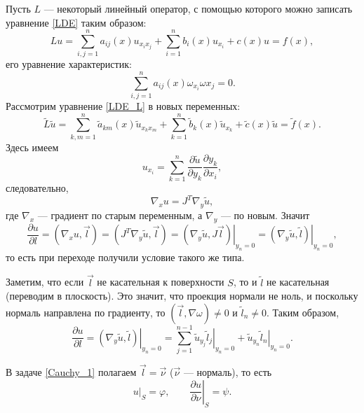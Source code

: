 \documentclass[12pt,a5paper]{book}
\begin{document}
	Пусть $L$ --- некоторый линейный оператор, с помощью которого можно записать уравнение \eqref{LDE} таким образом:
	\begin{equation}\label{LDE_L}
		Lu = \sum_{i,j=1}^{n}a_{ij}(x)u_{x_ix_j} + \sum_{i=1}^{n}b_i(x)u_{x_i} + c(x)u = f(x),
	\end{equation}
	его уравнение характеристик:
	\begin{equation}\label{eq_char_L}
		\sum_{i,j=1}^{n}a_{ij}(x)\omega_{x_i}\omega{x_j} = 0.
	\end{equation}
	Рассмотрим уравнение \eqref{LDE_L} в новых переменных:
	\begin{equation}\label{LDE_L_new}
		\tilde{L}\tilde{u} = \sum_{k,m=1}^{n}\tilde{a}_{km}(x)\tilde{u}_{x_kx_m} + \sum_{k=1}^{n}\tilde{b}_k(x)\tilde{u}_{x_k} + \tilde{c}(x)\tilde{u} = \tilde{f}(x).
	\end{equation}
	Здесь имеем
	\begin{equation*}
		u_{x_i} = \sum_{k=1}^{n}\frac{\partial\tilde{u}}{\partial y_k}\frac{\partial y_k}{\partial x_i},
	\end{equation*}
	следовательно,
	\begin{equation*}
		\nabla_x u = J^T\nabla_y \tilde{u},
	\end{equation*}
	где $\nabla_x$ --- градиент по старым переменным, а $\nabla_y$ --- по новым. Значит
	\begin{equation*}
		\frac{\partial u}{\partial l} = \left(\nabla_x u, \vec{l}\right) = \left(J^T\nabla_y \tilde{u}, \vec{l}\right) = \left.\left(\nabla_y \tilde{u}, J\vec{l}\right)\right|_{y_n=0} = \left.\left(\nabla_y \tilde{u}, \tilde{l}\right)\right|_{y_n=0},
	\end{equation*}
	то есть при переходе получили условие такого же типа.
	
	Заметим, что если $\vec{l}$ не касательная к поверхности $S$, то и $\tilde{l}$ не касательная (переводим в плоскость). Это значит, что проекция нормали не ноль, и поскольку нормаль направлена по градиенту, то $(\vec{l},\nabla\omega) \neq 0$ и $\tilde{l}_n \neq 0$. Таким образом,
	\begin{equation*}
		\frac{\partial u}{\partial l} = \left.\left(\nabla_y \tilde{u}, \tilde{l}\right)\right|_{y_n=0} = \sum_{j=1}^{n-1}\left.\tilde{u}_{y_j}\tilde{l}_j\right|_{y_n=0} + \left.\tilde{u}_{y_n}\tilde{l}_n\right|_{y_n=0}.
	\end{equation*}
	
	В задаче \eqref{Cauchy_1} полагаем $\vec{l} = \vec{\nu}$ ($\vec{\nu}$ --- нормаль), то есть
	\begin{equation*}
		u\big|_S = \varphi, \qquad \left.\frac{\partial u}{\partial \nu}\right|_S = \psi.
	\end{equation*}
	
\end{document}

